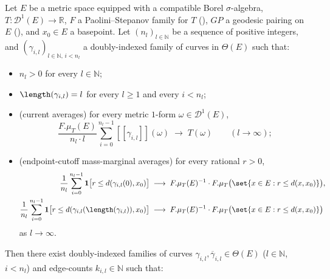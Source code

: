 \begin{lemma}\label{ClosingUp}
  Let $E$ be a metric space equipped with a compatible Borel $\sigma$-algebra,
  $T \colon \mathcal{D}^1(E) \to \mathbb{R}$, $F$ a Paolini--Stepanov family for $T$
  (), $GP$ a geodesic pairing on $E$ (), and
  $x_0 \in E$ a basepoint. Let $(n_l)_{l\in\mathbb{N}}$ be a sequence of positive integers, and
  $(\gamma_{i,l})_{l\in\mathbb{N},\,i<n_l}$ a doubly-indexed family of curves in $\Theta(E)$ such
  that:
  \begin{itemize}
    \item[(H0)] $n_l>0$ for every $l\in\mathbb{N}$;
    \item[(H1)] $\length(\gamma_{i,l}) = l$ for every $l\ge1$ and every $i<n_l$;
    \item[(H2)] (current averages) for every metric $1$-form $\omega \in \mathcal{D}^1(E)$,
      \[
        \frac{F.\mu_T(E)}{n_l\cdot l}\sum_{i=0}^{n_l-1}[[\gamma_{i,l}]](\omega)
        \;\longrightarrow\; T(\omega)
        \qquad(l\to\infty)
        ;
      \]
    \item[(H3)] (endpoint-cutoff mass-marginal averages) for every rational $r>0$,
      \begin{align*}
        \frac{1}{n_l}\sum_{i=0}^{n_l-1} \mathbf{1}\bigl[r \le d(\gamma_{i,l}(0),x_0)\bigr]
        &\;\longrightarrow\; F.\mu_T(E)^{-1}\cdot F.\mu_T\bigl(\set{x\in E : r \le d(x,x_0)}\bigr)
        ,
        \\
        \frac{1}{n_l}\sum_{i=0}^{n_l-1} \mathbf{1}\bigl[r \le d(\gamma_{i,l}(\length(\gamma_{i,l})),x_0)\bigr]
        &\;\longrightarrow\; F.\mu_T(E)^{-1}\cdot F.\mu_T\bigl(\set{x\in E : r \le d(x,x_0)}\bigr)
      \end{align*}
      as $l\to\infty$.
  \end{itemize}
  Then there exist doubly-indexed families of curves $\hat\gamma_{i,l},\overline\gamma_{i,l} \in
  \Theta(E)$ ($l\in\mathbb{N}$, $i<n_l$) and edge-counts $k_{i,l}\in\mathbb{N}$ such that:
\end{lemma}
